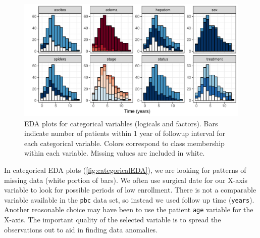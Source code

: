 \documentclass[article]{jss}
\begin{document}
\begin{Schunk}
\begin{figure}[!htb]

{\centering \includegraphics{rfs-categoricalEDA-1} 

}

\caption[EDA plots for categorical variables (logicals and factors)]{EDA plots for categorical variables (logicals and factors). Bars indicate number of patients within 1 year of followup interval for each categorical variable. Colors correspond to class membership within each variable. Missing values are included in white.}\label{fig:categoricalEDA}
\end{figure}
\end{Schunk}

In categorical EDA plots (\autoref{fig:categoricalEDA}), we are looking
for patterns of missing data (white portion of bars). We often use
surgical date for our X-axis variable to look for possible periods of
low enrollment. There is not a comparable variable available in the
\texttt{pbc} data set, so instead we used follow up time
(\texttt{years}). Another reasonable choice may have been to use the
patient \texttt{age} variable for the X-axis. The important quality of
the selected variable is to spread the observations out to aid in
finding data anomalies.
\end{document}
